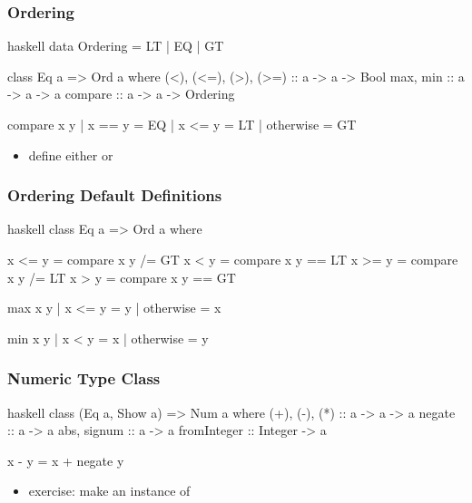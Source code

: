 \documentclass[dvipsnames]{beamer}
\theoremstyle{plain}
\begin{document}
\begin{frame}[fragile]
  \frametitle{Ordering}

  \begin{exampleblock}{}
    \begin{pygments}{haskell}
data Ordering = LT | EQ | GT

class Eq a => Ord a where
  (<), (<=), (>), (>=) :: a -> a -> Bool
  max, min             :: a -> a -> a
  compare              :: a -> a -> Ordering

  compare x y
    | x == y    = EQ
    | x <= y    = LT
    | otherwise = GT
    \end{pygments}
  \end{exampleblock}

  \begin{itemize}
    \item define either  or 
  \end{itemize}
\end{frame}

\begin{frame}[fragile]
  \frametitle{Ordering Default Definitions}

  \begin{exampleblock}{}
    \begin{pygments}{haskell}
class Eq a => Ord a where

  x <= y = compare x y /= GT
  x < y  = compare x y == LT
  x >= y = compare x y /= LT
  x > y  = compare x y == GT

  max x y
    | x <= y    = y
    | otherwise = x

  min x y
    | x < y     = x
    | otherwise = y
    \end{pygments}
  \end{exampleblock}
\end{frame}

\begin{frame}[fragile]
  \frametitle{Numeric Type Class}

  \begin{exampleblock}{}
    \begin{pygments}{haskell}
class (Eq a, Show a) => Num a where
  (+), (-), (*) :: a -> a -> a
  negate        :: a -> a
  abs, signum   :: a -> a
  fromInteger   :: Integer -> a

  x - y = x + negate y
    \end{pygments}
  \end{exampleblock}

  \begin{itemize}
    \item exercise: make  an instance of
  \end{itemize}
\end{frame}
\end{document}
